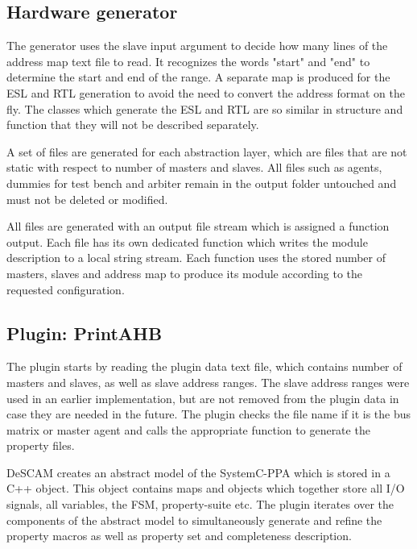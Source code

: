 \subsection{Hardware generator}
The generator uses the slave input argument to decide how many lines of the address map text file to read. It recognizes the words "start" and "end" to determine the start and end of the range. A separate map is produced for the ESL and RTL generation to avoid the need to convert the address format on the fly. The classes which generate the ESL and RTL are so similar in structure and function that they will not be described separately. \par
A set of files are generated for each abstraction layer, which are files that are not static with respect to number of masters and slaves. All files such as agents, dummies for test bench and arbiter remain in the output folder untouched and must not be deleted or modified. \par
All files are generated with an output file stream which is assigned a function output. Each file has its own dedicated function which writes the module description to a local string stream. Each function uses the stored number of masters, slaves and address map to produce its module according to the requested configuration. 

\subsection{Plugin: PrintAHB}
The plugin starts by reading the plugin data text file, which contains number of masters and slaves, as well as slave address ranges. The slave address ranges were used in an earlier implementation, but are not removed from the plugin data in case they are needed in the future. The plugin checks the file name if it is the bus matrix or master agent and calls the appropriate function to generate the property files. \par
DeSCAM creates an abstract model of the SystemC-PPA which is stored in a C++ object. This object contains maps and objects which together store all I/O signals, all variables, the FSM, property-suite etc. The plugin iterates over the components of the abstract model to simultaneously generate and refine the property macros as well as property set and completeness description.

